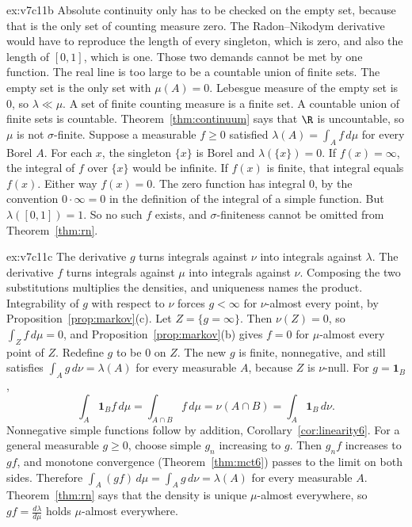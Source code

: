 \begin{solution}{ex:v7c11b}
\idea Absolute continuity only has to be checked on the empty set, because that is the only set of counting measure zero. The Radon--Nikodym derivative would have to reproduce the length of every singleton, which is zero, and also the length of $[0,1]$, which is one. Those two demands cannot be met by one function. The real line is too large to be a countable union of finite sets.
\writeup The empty set is the only set with $\mu(A)=0$. Lebesgue measure of the empty set is $0$, so $\lambda\ll\mu$. A set of finite counting measure is a finite set. A countable union of finite sets is countable. Theorem~\ref{thm:continuum} says that $\R$ is uncountable, so $\mu$ is not $\sigma$-finite. Suppose a measurable $f\ge0$ satisfied $\lambda(A)=\int_Af\,d\mu$ for every Borel $A$. For each $x$, the singleton $\{x\}$ is Borel and $\lambda(\{x\})=0$. If $f(x)=\infty$, the integral of $f$ over $\{x\}$ would be infinite. If $f(x)$ is finite, that integral equals $f(x)$. Either way $f(x)=0$. The zero function has integral $0$, by the convention $0\cdot\infty=0$ in the definition of the integral of a simple function. But $\lambda([0,1])=1$. So no such $f$ exists, and $\sigma$-finiteness cannot be omitted from Theorem~\ref{thm:rn}.
\end{solution}

\begin{solution}{ex:v7c11c}
\idea The derivative $g$ turns integrals against $\nu$ into integrals against $\lambda$. The derivative $f$ turns integrals against $\mu$ into integrals against $\nu$. Composing the two substitutions multiplies the densities, and uniqueness names the product.
\writeup Integrability of $g$ with respect to $\nu$ forces $g<\infty$ for $\nu$-almost every point, by Proposition~\ref{prop:markov}(c). Let $Z=\{g=\infty\}$. Then $\nu(Z)=0$, so $\int_Zf\,d\mu=0$, and Proposition~\ref{prop:markov}(b) gives $f=0$ for $\mu$-almost every point of $Z$. Redefine $g$ to be $0$ on $Z$. The new $g$ is finite, nonnegative, and still satisfies $\int_Ag\,d\nu=\lambda(A)$ for every measurable $A$, because $Z$ is $\nu$-null. For $g=\mathbf 1_B$,
\[
\int_A\mathbf 1_Bf\,d\mu=\int_{A\cap B}f\,d\mu=\nu(A\cap B)=\int_A\mathbf 1_B\,d\nu.
\]
Nonnegative simple functions follow by addition, Corollary~\ref{cor:linearity6}. For a general measurable $g\ge0$, choose simple $g_n$ increasing to $g$. Then $g_nf$ increases to $gf$, and monotone convergence (Theorem~\ref{thm:mct6}) passes to the limit on both sides. Therefore $\int_A(gf)\,d\mu=\int_Ag\,d\nu=\lambda(A)$ for every measurable $A$. Theorem~\ref{thm:rn} says that the density is unique $\mu$-almost everywhere, so $gf=\frac{d\lambda}{d\mu}$ holds $\mu$-almost everywhere.
\end{solution}

